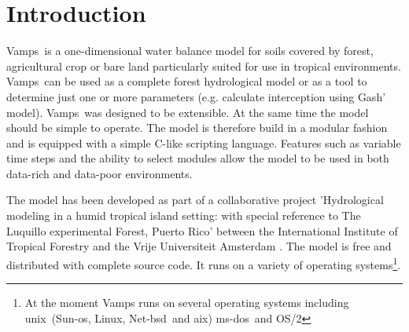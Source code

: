 \documentclass[11pt]{book}
\newcommand{\vamps}{{\sf Vamps}}
\newcommand{\unix}{{\sc unix}}
\newcommand{\linux}{Linux}
\newcommand{\netbsd}{Net-{\sc bsd}}
\newcommand{\msdos}{{\sc ms-dos}}
\newcommand{\ostwo} {{\sc OS/2}}
\newcommand{\aix}{{\sc aix}}
\newcommand{\sunos}{Sun-{\sc os}}
\begin{document}
\tableofcontents
\listoffigures
\listoftables
{}


\chapter{Introduction}
\vamps\ is a one-dimensional water balance model for soils covered by
forest, agricultural crop or bare land particularly suited for use
in tropical environments.  \vamps\ can be used as a complete forest
hydrological model or as a tool to determine just one or more parameters
(e.g. calculate interception using Gash' model). \vamps\ was designed to
be extensible. At the same time the model should be simple to operate. The
model is therefore build in a modular fashion and is equipped with
a simple C-like scripting language.  Features such as  variable time
steps and the ability to select modules allow the model to be used in
both data-rich and data-poor environments.

The model has been developed as part of a collaborative project
'Hydrological modeling in a humid tropical island setting: with
special reference to The Luquillo experimental Forest, Puerto Rico'
between the International Institute of Tropical Forestry and the Vrije
Universiteit Amsterdam \cite{bruijnzeel1994}.  The model is free and
distributed with complete source code. It runs on a variety of operating
systems\footnote{At the moment \vamps{} runs on several operating
systems including \unix\ (\sunos{}, \linux{}, \netbsd\ and \aix{})
\msdos\ and \ostwo{}}.
\end{document}
